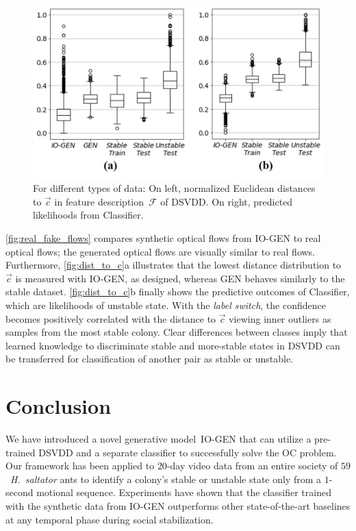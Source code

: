 \documentclass[letterpaper]{article} %
\let\orgautoref\autoref
\providecommand{\Autoref}
{\def\equationautorefname{Equation}%
	\def\figureautorefname{Figure}%
	\def\subfigureautorefname{Figure}%
	\def\Itemautorefname{Item}%
	\def\tableautorefname{Table}%
	\def\exerciseautorefname{Exercise}%
	\def\starexerciseautorefname{Exercise}%
	\def\sectionautorefname{Section}%
	\def\subsectionautorefname{Section}%
	\def\subsubsectionautorefname{Section}%
	\def\chapterautorefname{Section}%
	\def\partautorefname{Part}%
	\orgautoref}
\renewcommand{\autoref}
{\def\equationautorefname{Equation}%
	\def\figureautorefname{Fig.}%
	\def\subfigureautorefname{Fig.}%
	\def\Itemautorefname{item}%
	\def\tableautorefname{Table}%
	\def\exerciseautorefname{Exercise}%
	\def\starexerciseautorefname{Exercise}%
	\def\sectionautorefname{Section}%
	\def\subsectionautorefname{Section}%
	\def\subsubsectionautorefname{Section}%
	\def\chapterautorefname{Section}%
	\def\partautorefname{Part}%
	\orgautoref}
\begin{document}
\begin{figure}
	\centering
    \includegraphics[trim={0pt 30pt 0pt 0pt},clip,width=.98\columnwidth]{dist_to_c}
	\caption{For different types of data:
        On left, normalized Euclidean distances to $\vec{c}$
		in feature description~$\mathcal{F}$ of DSVDD.
        On right, predicted likelihoods from Classifier.
	}
	\label{fig:dist_to_c}
\end{figure}
\Autoref{fig:real_fake_flows} compares synthetic optical flows from
\mbox{IO-GEN} to real optical flows; the generated optical flows are
visually similar to real flows. Furthermore, \autoref{fig:dist_to_c}a
illustrates that the lowest distance distribution to $\vec{c}$ is
measured with \mbox{IO-GEN}, as designed, whereas GEN behaves similarly to the
stable dataset. \Autoref{fig:dist_to_c}b finally shows the predictive
outcomes of Classifier, which are likelihoods of unstable state. With
the \emph{label switch}, the confidence becomes positively correlated
with the distance to $\vec{c}$ viewing inner outliers as samples from
the most stable colony. Clear differences between classes imply that
learned knowledge to discriminate stable and more-stable states in DSVDD
can be transferred for classification of another pair as stable or
unstable.




\section{Conclusion}
\label{sec:conclusion}

We have introduced a novel generative model~\mbox{IO-GEN} that can utilize
a pre-trained DSVDD and a separate classifier to successfully
solve the OC problem. Our framework has been applied to $20$-day
video data from an entire society of $59$~\emph{H.~saltator}
ants to identify a colony's stable or unstable state only from a
$1$-second motional sequence. Experiments have shown that the
classifier trained with the synthetic data from \mbox{IO-GEN} outperforms
other state-of-the-art baselines at any temporal phase during social
stabilization.
\end{document}
